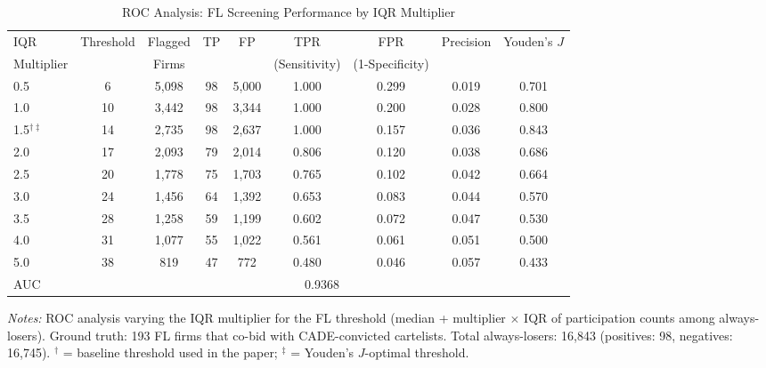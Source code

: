 \begin{table}[htbp]
\centering
\caption{ROC Analysis: FL Screening Performance by IQR Multiplier}
\label{tab:roc_detection}
\begin{adjustbox}{max width=\textwidth}
\begin{threeparttable}
\small
\begin{tabular}{lcccccccc}
\toprule
IQR & Threshold & Flagged & TP & FP & TPR & FPR & Precision & Youden's $J$ \\
Multiplier & & Firms & & & (Sensitivity) & (1-Specificity) & & \\
\midrule
0.5 & 6 & 5,098 & 98 & 5,000 & 1.000 & 0.299 & 0.019 & 0.701 \\
1.0 & 10 & 3,442 & 98 & 3,344 & 1.000 & 0.200 & 0.028 & 0.800 \\
1.5$^{\dagger\ddagger}$ & 14 & 2,735 & 98 & 2,637 & 1.000 & 0.157 & 0.036 & 0.843 \\
2.0 & 17 & 2,093 & 79 & 2,014 & 0.806 & 0.120 & 0.038 & 0.686 \\
2.5 & 20 & 1,778 & 75 & 1,703 & 0.765 & 0.102 & 0.042 & 0.664 \\
3.0 & 24 & 1,456 & 64 & 1,392 & 0.653 & 0.083 & 0.044 & 0.570 \\
3.5 & 28 & 1,258 & 59 & 1,199 & 0.602 & 0.072 & 0.047 & 0.530 \\
4.0 & 31 & 1,077 & 55 & 1,022 & 0.561 & 0.061 & 0.051 & 0.500 \\
5.0 & 38 & 819 & 47 & 772 & 0.480 & 0.046 & 0.057 & 0.433 \\
\midrule
AUC & \multicolumn{8}{c}{0.9368} \\
\bottomrule
\end{tabular}
\begin{tablenotes}
\small
\item \textit{Notes:} ROC analysis varying the IQR multiplier for the FL
threshold (median + multiplier $\times$ IQR of participation counts among
always-losers). Ground truth: 193 FL firms that co-bid with CADE-convicted
cartelists. Total always-losers: 16,843 (positives: 98,
negatives: 16,745).
$^{\dagger}$ = baseline threshold used in the paper;
$^{\ddagger}$ = Youden's $J$-optimal threshold.
\end{tablenotes}
\end{threeparttable}
\end{adjustbox}
\end{table}